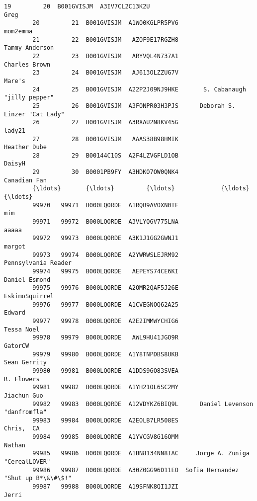 \documentclass[11pt]{article}
\begin{document}
\begin{Verbatim}[commandchars=\\\{\}]
        19         20  B001GVISJM  A3IV7CL2C13K2U                              Greg   
        20         21  B001GVISJM  A1WO0KGLPR5PV6                          mom2emma   
        21         22  B001GVISJM   AZOF9E17RGZH8                    Tammy Anderson   
        22         23  B001GVISJM   ARYVQL4N737A1                     Charles Brown   
        23         24  B001GVISJM   AJ613OLZZUG7V                            Mare's   
        24         25  B001GVISJM  A22P2J09NJ9HKE       S. Cabanaugh "jilly pepper"   
        25         26  B001GVISJM  A3FONPR03H3PJS      Deborah S. Linzer "Cat Lady"   
        26         27  B001GVISJM  A3RXAU2N8KV45G                            lady21   
        27         28  B001GVISJM   AAAS38B98HMIK                      Heather Dube   
        28         29  B00144C10S  A2F4LZVGFLD1OB                            DaisyH   
        29         30  B0001PB9FY  A3HDKO7OW0QNK4                      Canadian Fan   
        {\ldots}       {\ldots}         {\ldots}             {\ldots}                               {\ldots}   
        99970   99971  B000LQORDE  A1RQB9AVOXN0TF                               mim   
        99971   99972  B000LQORDE  A3VLYQ6V775LNA                             aaaaa   
        99972   99973  B000LQORDE  A3K1J1GG2GWNJ1                            margot   
        99973   99974  B000LQORDE  A2YWRWSLEJRM92               Pennsylvania Reader   
        99974   99975  B000LQORDE   AEPEYS74CE6KI                     Daniel Esmond   
        99975   99976  B000LQORDE  A2OMR2QAF5J26E                    EskimoSquirrel   
        99976   99977  B000LQORDE  A1CVEGNOQ62A25                            Edward   
        99977   99978  B000LQORDE  A2E2IMMWYCHIG6                        Tessa Noel   
        99978   99979  B000LQORDE   AWL9HU41JGO9R                           GatorCW   
        99979   99980  B000LQORDE  A1Y8TNPDBS8UKB                      Sean Gerrity   
        99980   99981  B000LQORDE  A1DDS96O83SVEA                        R. Flowers   
        99981   99982  B000LQORDE  A1YH21OL6SC2MY                       Jiachun Guo   
        99982   99983  B000LQORDE  A12VDYKZ6BIQ9L      Daniel Levenson "danfromfla"   
        99983   99984  B000LQORDE  A2EOLB7LR508ES                        Chris,  CA   
        99984   99985  B000LQORDE  A1YVCGV8G16OMM                            Nathan   
        99985   99986  B000LQORDE  A1BN8134NN8IAC     Jorge A. Zuniga "CerealLOVER"   
        99986   99987  B000LQORDE  A30Z0GG96D11EO  Sofia Hernandez "Shut up B*\&\#\$!"   
        99987   99988  B000LQORDE  A19SFNK8QI1JZI                             Jerri   

\end{Verbatim}
\end{document}
